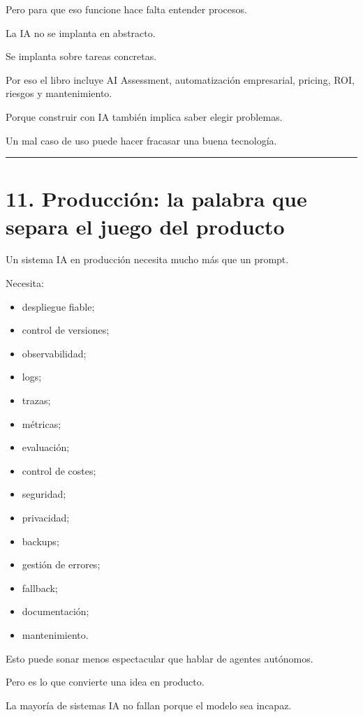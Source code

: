 Pero para que eso funcione hace falta entender procesos.

La IA no se implanta en abstracto.

Se implanta sobre tareas concretas.

Por eso el libro incluye AI Assessment, automatización empresarial,
pricing, ROI, riesgos y mantenimiento.

Porque construir con IA también implica saber elegir problemas.

Un mal caso de uso puede hacer fracasar una buena tecnología.

\begin{center}\rule{0.5\linewidth}{0.5pt}\end{center}

\section{11. Producción: la palabra que separa el juego del
producto}\label{producciuxf3n-la-palabra-que-separa-el-juego-del-producto}

Un sistema IA en producción necesita mucho más que un prompt.

Necesita:

\begin{itemize}
\tightlist
\item
  despliegue fiable;
\item
  control de versiones;
\item
  observabilidad;
\item
  logs;
\item
  trazas;
\item
  métricas;
\item
  evaluación;
\item
  control de costes;
\item
  seguridad;
\item
  privacidad;
\item
  backups;
\item
  gestión de errores;
\item
  fallback;
\item
  documentación;
\item
  mantenimiento.
\end{itemize}

Esto puede sonar menos espectacular que hablar de agentes autónomos.

Pero es lo que convierte una idea en producto.

La mayoría de sistemas IA no fallan porque el modelo sea incapaz.

